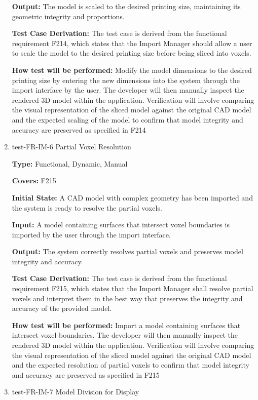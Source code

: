 \documentclass[12pt, titlepage]{article}
\begin{document}
\begin{enumerate}
\textbf{Output:} The model is scaled to the desired printing size, maintaining its geometric integrity and proportions.

\textbf{Test Case Derivation:} The test case is derived from the functional requirement F214, which states that the Import Manager should allow a user to scale the model to the desired printing size before being sliced into voxels.
					
\textbf{How test will be performed:} Modify the model dimensions to the desired printing size by entering the new dimensions into the system through the import interface by the user. The developer will then manually inspect the rendered 3D model within the application. Verification will involve comparing the visual representation of the sliced model against the original CAD model and the expected scaling of the model to confirm that model integrity and accuracy are preserved as specified in F214

\item{test-FR-IM-6 Partial Voxel Resolution\\}

\textbf{Type:} Functional, Dynamic, Manual

\textbf{Covers:} F215
					
\textbf{Initial State:} A CAD model with complex geometry has been imported and the system is ready to resolve the partial voxels.
					
\textbf{Input:} A model containing surfaces that intersect voxel boundaries is imported by the user through the import interface.
					
\textbf{Output:} The system correctly resolves partial voxels and preserves model integrity and accuracy.

\textbf{Test Case Derivation:} The test case is derived from the functional requirement F215, which states that the Import Manager shall resolve partial voxels and interpret them in the best way that preserves the integrity and accuracy of the provided model.
					
\textbf{How test will be performed:} Import a model containing surfaces that intersect voxel boundaries. The developer will then manually inspect the rendered 3D model within the application. Verification will involve comparing the visual representation of the sliced model against the original CAD model and the expected resolution of partial voxels to confirm that model integrity and accuracy are preserved as specified in F215

\item{test-FR-IM-7 Model Division for Display\\}


\end{enumerate}
\end{document}
